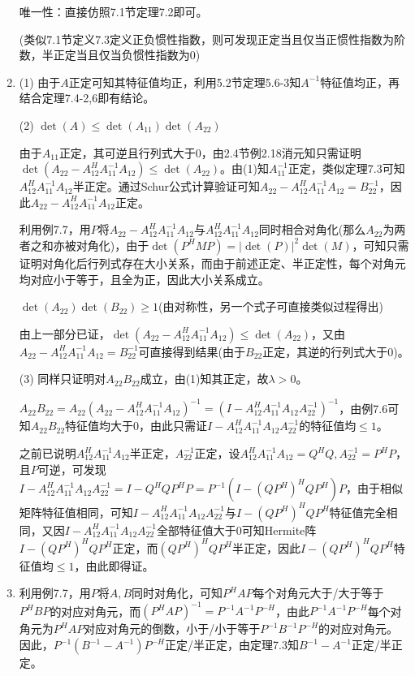 \documentclass[a4paper,UTF8,fontset=windows]{ctexart}
\begin{document}
\begin{enumerate}
唯一性：直接仿照7.1节定理7.2即可。

(类似7.1节定义7.3定义正负惯性指数，则可发现正定当且仅当正惯性指数为阶数，半正定当且仅当负惯性指数为0)

\item
(1) 由于$A$正定可知其特征值均正，利用5.2节定理5.6-3知$A^{-1}$特征值均正，再结合定理7.4-2,6即有结论。

(2) $\det(A)\le\det(A_{11})\det(A_{22})$

由于$A_{11}$正定，其可逆且行列式大于0，由2.4节例2.18消元知只需证明$\det(A_{22}-A_{12}^HA_{11}^{-1}A_{12})\le\det(A_{22})$。由(1)知$A_{11}^{-1}$正定，类似定理7.3可知$A_{12}^HA_{11}^{-1}A_{12}$半正定。通过Schur公式计算验证可知$A_{22}-A_{12}^HA_{11}^{-1}A_{12}=B_{22}^{-1}$，因此$A_{22}-A_{12}^HA_{11}^{-1}A_{12}$正定。

利用例7.7，用$P$将$A_{22}-A_{12}^HA_{11}^{-1}A_{12}$与$A_{12}^HA_{11}^{-1}A_{12}$同时相合对角化(那么$A_{22}$为两者之和亦被对角化)，由于$\det(P^HMP)=|\det(P)|^2\det(M)$，可知只需证明对角化后行列式存在大小关系，而由于前述正定、半正定性，每个对角元均对应小于等于，且全为正，因此大小关系成立。

$\det(A_{22})\det(B_{22})\ge1$(由对称性，另一个式子可直接类似过程得出)

由上一部分已证，$\det(A_{22}-A_{12}^HA_{11}^{-1}A_{12})\le\det(A_{22})$，又由$A_{22}-A_{12}^HA_{11}^{-1}A_{12}=B_{22}^{-1}$可直接得到结果(由于$B_{22}$正定，其逆的行列式大于0)。

(3) 同样只证明对$A_{22}B_{22}$成立，由(1)知其正定，故$\lambda>0$。

$A_{22}B_{22}=A_{22}(A_{22}-A_{12}^HA_{11}^{-1}A_{12})^{-1}=(I-A_{12}^HA_{11}^{-1}A_{12}A_{22}^{-1})^{-1}$，由例7.6可知$A_{22}B_{22}$特征值均大于0，由此只需证$I-A_{12}^HA_{11}^{-1}A_{12}A_{22}^{-1}$的特征值均$\le1$。

之前已说明$A_{12}^HA_{11}^{-1}A_{12}$半正定，$A_{22}^{-1}$正定，设$A_{12}^HA_{11}^{-1}A_{12}=Q^HQ,A_{22}^{-1}=P^HP$，且$P$可逆，可发现$I-A_{12}^HA_{11}^{-1}A_{12}A_{22}^{-1}=I-Q^HQP^HP=P^{-1}(I-(QP^H)^HQP^H)P$，由于相似矩阵特征值相同，可知$I-A_{12}^HA_{11}^{-1}A_{12}A_{22}^{-1}$与$I-(QP^H)^HQP^H$特征值完全相同，又因$I-A_{12}^HA_{11}^{-1}A_{12}A_{22}^{-1}$全部特征值大于0可知Hermite阵$I-(QP^H)^HQP^H$正定，而$(QP^H)^HQP^H$半正定，因此$I-(QP^H)^HQP^H$特征值均$\le1$，由此即得证。

\item
利用例7.7，用$P$将$A,B$同时对角化，可知$P^HAP$每个对角元大于/大于等于$P^HBP$的对应对角元，而$(P^HAP)^{-1}=P^{-1}A^{-1}P^{-H}$，由此$P^{-1}A^{-1}P^{-H}$每个对角元为$P^HAP$对应对角元的倒数，小于/小于等于$P^{-1}B^{-1}P^{-H}$的对应对角元。因此，$P^{-1}(B^{-1}-A^{-1})P^{-H}$正定/半正定，由定理7.3知$B^{-1}-A^{-1}$正定/半正定。


\end{enumerate}
\end{document}
